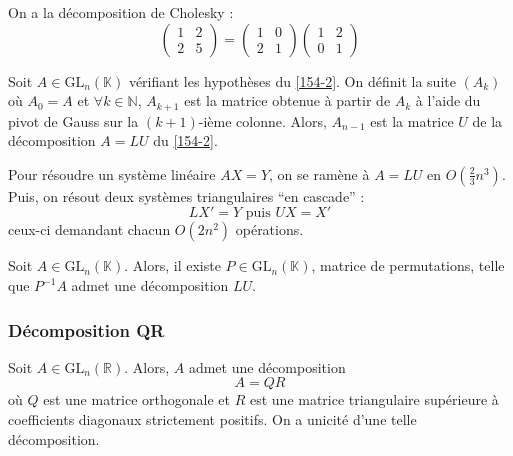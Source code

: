   \begin{example}
    On a la décomposition de Cholesky :
    \[ \begin{pmatrix} 1 & 2 \\ 2 & 5 \end{pmatrix} = \begin{pmatrix} 1 & 0 \\ 2 & 1 \end{pmatrix} \begin{pmatrix} 1 & 2 \\ 0 & 1 \end{pmatrix} \]
  \end{example}
  
  
  \begin{proposition}
    Soit $A \in \mathrm{GL}_n(\mathbb{K})$ vérifiant les hypothèses du \cref{154-2}. On définit la suite $(A_k)$ où $A_0 = A$ et $\forall k \in \mathbb{N}$, $A_{k+1}$ est la matrice obtenue à partir de $A_k$ à l'aide du pivot de Gauss sur la $(k+1)$-ième colonne. Alors, $A_{n-1}$ est la matrice $U$ de la décomposition $A = LU$ du \cref{154-2}.
  \end{proposition}
  
  \begin{remark}
    Pour résoudre un système linéaire $AX = Y$, on se ramène à $A = LU$ en $O \left( \frac{2}{3}n^3 \right)$. Puis, on résout deux systèmes triangulaires ``en cascade'' :
    \[ LX' = Y \text{ puis } UX = X' \]
    ceux-ci demandant chacun $O(2n^2)$ opérations.
  \end{remark}
  
  \begin{theorem}
    Soit $A \in \mathrm{GL}_n(\mathbb{K})$. Alors, il existe $P \in \mathrm{GL}_n(\mathbb{K})$, matrice de permutations, telle que $P^{-1}A$ admet une décomposition $LU$.
  \end{theorem}
  
  \subsubsection{Décomposition QR}
  
  
  \begin{theorem}[Décomposition QR]
    Soit $A \in \mathrm{GL}_n(\mathbb{R})$. Alors, $A$ admet une décomposition
    \[ A = QR \]
    où $Q$ est une matrice orthogonale et $R$ est une matrice triangulaire supérieure à coefficients diagonaux strictement positifs. On a unicité d'une telle décomposition.
  \end{theorem}
  
